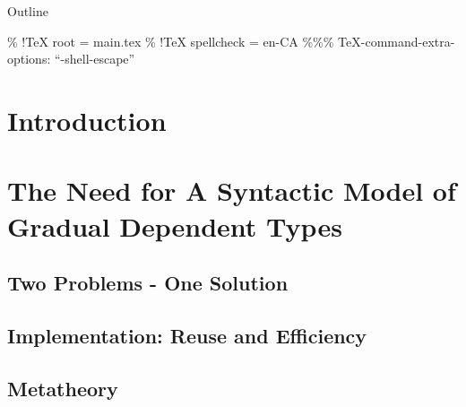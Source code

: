 \documentclass[presentation]{beamer}
\author{Joey Eremondi}
\date{\today}
\title{}
\begin{document}
\begin{frame}{Outline}
\tableofcontents
\end{frame}

\% !\TeX{} root = main.tex
\% !\TeX{} spellcheck = en-CA
\%\%\% \TeX{}-command-extra-options: ``-shell-escape''

\section{Introduction}

\section{The Need for A Syntactic Model of Gradual Dependent Types}

\subsection{Two Problems - One Solution}

\subsection{Implementation: Reuse and Efficiency}

\subsection{Metatheory}
\end{document}
